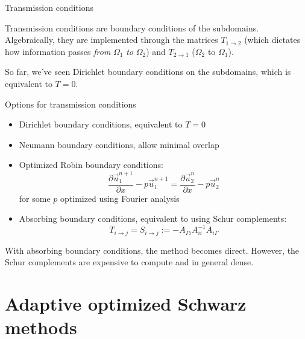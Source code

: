 \documentclass{beamer}
\begin{document}
\begin{frame}{Transmission conditions}

Transmission conditions are boundary conditions of the subdomains.
Algebraically, they are implemented through the matrices $T_{1 \to 2}$ (which dictates how information passes \textit{from} $\Omega_1$ \textit{to} $\Omega_2$) and $T_{2 \to 1}$ ($\Omega_2$ to $\Omega_1$).

So far, we've seen Dirichlet boundary conditions on the subdomains, which is equivalent to $T=0$.

\end{frame}

\begin{frame}{Options for transmission conditions}

\begin{itemize}
\item Dirichlet boundary conditions, equivalent to $T=0$
\item Neumann boundary conditions, allow minimal overlap
\item Optimized Robin boundary conditions:
\begin{equation*}
	\frac{\partial \vec{u}_1^{n+1}}{\partial x} - p \vec{u}_1^{n+1} = \frac{\partial \vec{u}_2^{n}}{\partial x} - p \vec{u}_2^{n}
\end{equation*}
for some $p$ optimized using Fourier analysis
\item Absorbing boundary conditions, equivalent to using Schur complements:
\begin{equation*}
	T_{i \to j} = S_{i \to j} := -A_{\Gamma i} A_{ii}^{-1} A_{i \Gamma}
\end{equation*}
\end{itemize}
With absorbing boundary conditions, the method becomes direct.
However, the Schur complements are expensive to compute and in general dense.

\end{frame}





\section{Adaptive optimized Schwarz methods} %
\end{document}
